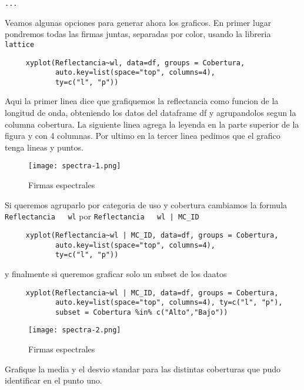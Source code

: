 \begin{exa}
\begin{Verbatim}[fontsize=\small]
     ...
     \end{Verbatim}
     Veamos algunas opciones para generar ahora los graficos. En primer lugar
     pondremos todas las firmas juntas, separadas por color, usando la libreria
     \texttt{lattice}
     \begin{lstlisting}
     xyplot(Reflectancia~wl, data=df, groups = Cobertura,
            auto.key=list(space="top", columns=4),
            ty=c("l", "p"))
     \end{lstlisting}
     Aqui la primer linea dice que grafiquemos la reflectancia como funcion de
     la longitud de onda, obteniendo los datos del dataframe df y agrupandolos
     segun la columna cobertura. La siguiente linea agrega la leyenda en la
     parte superior de la figura y con 4 columnas. Por ultimo en la tercer linea
     pedimos que el grafico tenga lineas y puntos.
     \begin{figure}[h!]
     \begin{center}
         \texttt{[image: spectra-1.png]}
     \end{center}
     \caption{Firmas espectrales}
     \label{fig:spectra-1}
     \end{figure}
     Si queremos agruparlo por categoria de uso y cobertura cambiamos la formula
     \texttt{Reflectancia ~ wl} por \texttt{Reflectancia ~ wl | MC\_ID}
     \begin{lstlisting}
     xyplot(Reflectancia~wl | MC_ID, data=df, groups = Cobertura,
            auto.key=list(space="top", columns=4),
            ty=c("l", "p"))
     \end{lstlisting}
     y finalmente si queremos graficar solo un subset de los daatos
     \begin{lstlisting}
     xyplot(Reflectancia~wl | MC_ID, data=df, groups = Cobertura,
            auto.key=list(space="top", columns=4), ty=c("l", "p"),
            subset = Cobertura %in% c("Alto","Bajo"))
     \end{lstlisting}
     \begin{figure}[h!]
     \begin{center}
         \texttt{[image: spectra-2.png]}
     \end{center}
     \caption{Firmas espectrales}
     \label{fig:spectra-1}
     \end{figure}
 \end{exa}

\begin{act}
    Grafique la media y el desvio standar para las distintas coberturas que pudo
     identificar en el punto uno.
\end{act}
